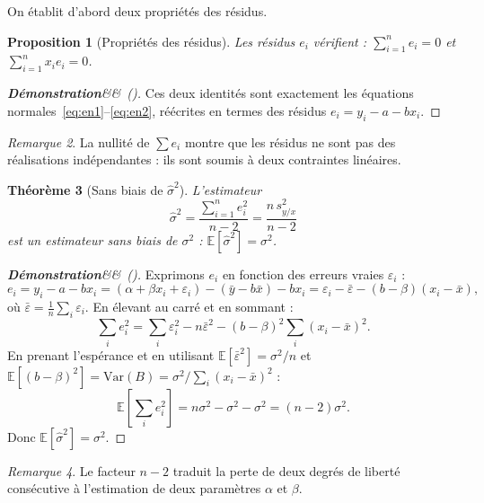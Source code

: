 \documentclass[12pt,a4paper]{article}
\newtheorem{theoreme}{Théorème}[section]
\newtheorem{proposition}[theoreme]{Proposition}
\theoremstyle{definition}
\theoremstyle{remark}
\newtheorem{remarque}[theoreme]{Remarque}
\newenvironment{demonstration}[1][]
  {\begin{proof}[\textbf{Démonstration}\ifx&#1&\else\ (#1)\fi]}
  {\end{proof}}
\newcommand{\Esp}{\mathbb{E}}
\newcommand{\Var}{\mathrm{Var}}
\newcommand{\xbar}{\bar{x}}
\newcommand{\ybar}{\bar{y}}
\begin{document}
On établit d'abord deux propriétés des résidus.

\begin{proposition}[Propriétés des résidus]
\label{prop:resid}
Les résidus $e_i$ vérifient : $\sum_{i=1}^n e_i = 0$ et $\sum_{i=1}^n x_i e_i = 0$.
\end{proposition}

\begin{demonstration}
Ces deux identités sont exactement les équations normales~\eqref{eq:en1}--\eqref{eq:en2},
réécrites en termes des résidus $e_i = y_i - a - bx_i$.
\end{demonstration}

\begin{remarque}
La nullité de $\sum e_i$ montre que les résidus ne sont pas des réalisations
indépendantes : ils sont soumis à deux contraintes linéaires.
\end{remarque}

\begin{theoreme}[Sans biais de $\hat{\sigma}^2$]
\label{thm:sigma}
L'estimateur
\begin{equation}
  \label{eq:shat}
  \hat{\sigma}^2 = \frac{\displaystyle\sum_{i=1}^n e_i^2}{n - 2}
                = \frac{n\,s_{y/x}^2}{n-2}
\end{equation}
est un estimateur sans biais de $\sigma^2$ :
$\Esp[\hat{\sigma}^2] = \sigma^2$.
\end{theoreme}

\begin{demonstration}
Exprimons $e_i$ en fonction des erreurs vraies $\varepsilon_i$ :
\[
  e_i = y_i - a - bx_i = (\alpha + \beta x_i + \varepsilon_i)
        - (\ybar - b\xbar) - b x_i
      = \varepsilon_i - \bar{\varepsilon} - (b - \beta)(x_i - \xbar),
\]
où $\bar{\varepsilon} = \frac{1}{n}\sum_i \varepsilon_i$.
En élevant au carré et en sommant :
\[
  \sum_i e_i^2
  = \sum_i\varepsilon_i^2 - n\bar{\varepsilon}^2 - (b-\beta)^2\sum_i(x_i-\xbar)^2.
\]
En prenant l'espérance et en utilisant
$\Esp[\bar{\varepsilon}^2] = \sigma^2/n$ et
$\Esp[(b-\beta)^2] = \Var(B) = \sigma^2/\sum_i(x_i-\xbar)^2$ :
\[
  \Esp\!\left[\sum_i e_i^2\right]
  = n\sigma^2 - \sigma^2 - \sigma^2 = (n-2)\sigma^2.
\]
Donc $\Esp[\hat{\sigma}^2] = \sigma^2$.
\end{demonstration}

\begin{remarque}
Le facteur $n-2$ traduit la perte de deux degrés de liberté
consécutive à l'estimation de deux paramètres $\alpha$ et $\beta$.
\end{remarque}
\end{document}
